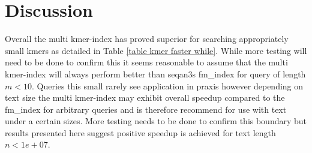 \section{Discussion}
Overall the multi kmer-index has proved superior for searching appropriately small kmers as detailed in Table
\ref{table kmer faster while}. While more testing will need to be done to confirm this it seems reasonable to assume
that the multi kmer-index will always perform better than seqan3s fm\_index for query of length $m<10$. Queries this small
rarely see application in praxis however depending on text size the multi kmer-index may
exhibit overall speedup compared to the fm\_index for arbitrary queries and is therefore recommend for use with text
under a certain sizes. More testing needs to be done to confirm this boundary but results presented here suggest
positive speedup is achieved for text length $n<1e+07$.



